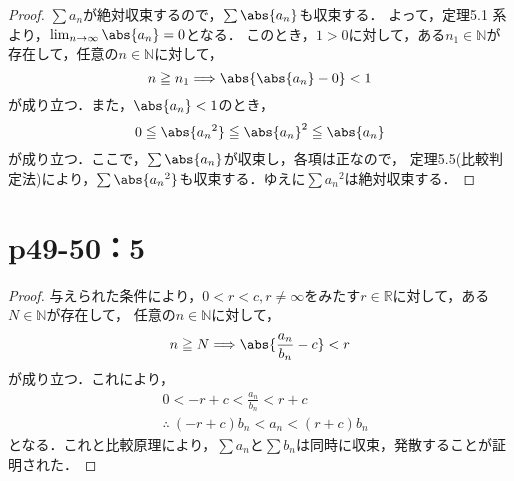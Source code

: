 \documentclass[a4paper,10pt,fleqn]{ltjsarticle}
\begin{document}
    \begin{tleftbar}
        \begin{proof}
            $\sum a_n $が絶対収束するので，$\sum \abs{a_n}$も収束する．
            よって，定理5.1 系より，$\lim_{n \to \infty} \abs{a_n} =0$となる．
            このとき，$1>0$に対して，ある$n_1 \in \mathbb{N}$が存在して，任意の$n \in \mathbb{N}$に対して，
            \[
                n \ge n_1 \Longrightarrow \abs{\abs{a_n} -0}<1
            \]
            が成り立つ．また，$\abs{a_n}<1$のとき，
            \[
                0 \le \abs{{a_n}^2} \le {\abs{a_n}}^2 \le \abs{a_n}
            \]
            が成り立つ．ここで，$\sum \abs{a_n}$が収束し，各項は正なので， 定理5.5(比較判定法)により，$\sum \abs{{a_n}^2}$も収束する．ゆえに$\sum {a_n}^2$は絶対収束する．
        \end{proof}
    \end{tleftbar}


    \section*{p49-50：5}

    \begin{tleftbar}
        \begin{proof}
            与えられた条件により，$0 <r <c , r \ne \infty $をみたす$r \in \mathbb{R}$に対して，ある$N \in \mathbb{N}$が存在して，
            任意の$n \in \mathbb{N}$に対して，
            \[
                n \ge N \Longrightarrow \abs{\frac{a_n}{b_n}-c}<r
            \]
            が成り立つ．これにより，
            \begin{align*}
                & 0<-r +c < \frac{a_n}{b_n} < r+c \\
                &\therefore ~  (-r+c) b_n < a_n < (r+c) b_n
            \end{align*}
            となる．これと比較原理により，$\sum a_n$と$\sum b_n$は同時に収束，発散することが証明された．
        \end{proof}
    \end{tleftbar}
\end{document}
